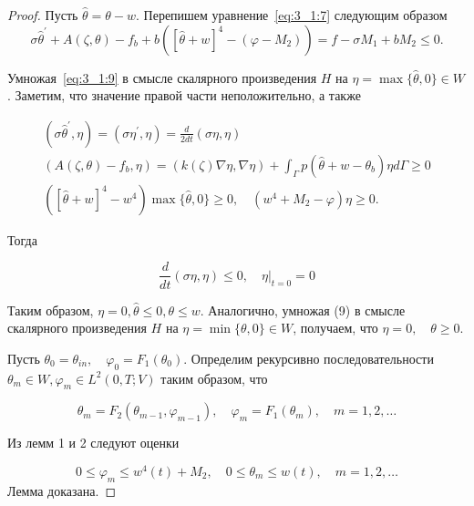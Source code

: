 \begin{proof}
Пусть $\widehat{\theta}=\theta-w$.
Перепишем уравнение~\eqref{eq:3_1:7} следующим образом
\begin{equation}
    \label{eq:3_1:9}
    \sigma \widehat{\theta}^{\prime}+A(\zeta, \theta)
    -f_{b}+b\left([\widehat{\theta}+w]^{4}-
    \left(\varphi-M_{2}\right)\right)=f-\sigma M_{1}+b M_{2} \leq 0.
\end{equation}

Умножая~\eqref{eq:3_1:9} в смысле скалярного
произведения $H$ на $\eta=\max \{\widehat{\theta}, 0\} \in W$.
Заметим, что значение правой части неположительно, а также

\[
    \begin{gathered}
        \left(\sigma \widehat{\theta}^{\prime}, \eta\right)=
        \left(\sigma \eta^{\prime}, \eta\right)=\frac{d}{2 d t}(\sigma \eta, \eta) \\
        \left(A(\zeta, \theta)-f_{b}, \eta\right)=(k(\zeta) \nabla \eta, \nabla \eta)
        + \int_{\Gamma} p\left(\widehat{\theta}+w-\theta_{b}\right) \eta d \Gamma \geq 0 \\
        \left([\widehat{\theta}+w]^{4}-w^{4}\right) \max
        \{\widehat{\theta}, 0\} \geq 0, \quad\left(w^{4}
        + M_{2} - \varphi\right) \eta \geq 0.
    \end{gathered}
\]


Тогда

\[
    \frac{d}{d t}(\sigma \eta, \eta) \leq 0,\left.\quad \eta\right|_{t=0}=0
\]

Таким образом, $\eta=0, \widehat{\theta} \leq 0, \theta \leq w$.
Аналогично, умножая (9) в смысле скалярного произведения
$H$ на $\eta=\min \{\theta, 0\} \in W$, получаем, что $\eta=0, \quad \theta \geq 0$.

Пусть $\theta_{0}=\theta_{i n}, \quad \varphi_{0}=F_{1}\left(\theta_{0}\right)$.
Определим рекурсивно последовательности
$\theta_{m} \in W, \varphi_{m} \in L^{2}(0, T ; V)$ таким образом, что

\begin{equation}
    \label{eq:3_1:10}
    \theta_{m}=F_{2}\left(\theta_{m-1}, \varphi_{m-1}\right),
    \quad \varphi_{m}=F_{1}\left(\theta_{m}\right), \quad m=1,2, \ldots
\end{equation}


Из лемм 1 и 2 следуют оценки

\begin{equation}
    \label{eq:3_1:11}
    0 \leq \varphi_{m} \leq w^{4}(t)+M_{2},
    \quad 0 \leq \theta_{m} \leq w(t), \quad m=1,2, \ldots
\end{equation}
    Лемма доказана.
\end{proof}
